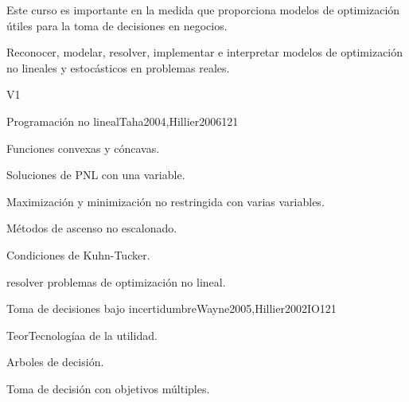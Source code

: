 \begin{syllabus}


\begin{justification}
Este curso es importante en la medida que proporciona modelos de optimización útiles para la toma de decisiones en negocios.
\end{justification}

\begin{goals}
\item Reconocer, modelar, resolver, implementar e interpretar modelos de optimización no lineales y estocásticos en problemas reales.
\end{goals}

\begin{outcomes}{V1}
\end{outcomes}

\begin{unit}{Programación no lineal}{}{Taha2004,Hillier2006}{12}{1}
   \begin{topics}
      \item Funciones convexas y cóncavas.
      \item Soluciones de PNL con una variable.
      \item Maximización y minimización no restringida con varias variables.
      \item Métodos de ascenso no escalonado.
      \item Condiciones de Kuhn-Tucker.
   \end{topics}

   \begin{learningoutcomes}
      \item resolver problemas de optimización no lineal.
   \end{learningoutcomes}
\end{unit}

\begin{unit}{Toma de decisiones bajo incertidumbre}{}{Wayne2005,Hillier2002IO}{12}{1}
   \begin{topics}
      \item TeorTecnologíaa de la utilidad.
      \item Arboles de decisión.
      \item Toma de decisión con objetivos múltiples.
   \end{topics}


\end{unit}
\end{syllabus}
